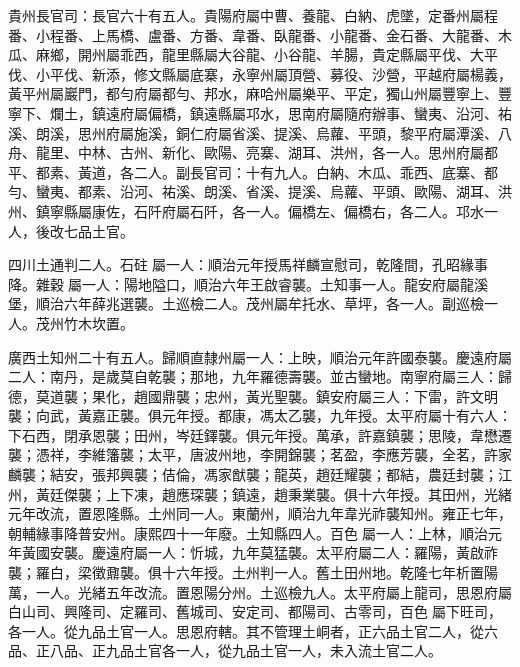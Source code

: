\begin{pinyinscope}
貴州長官司：長官六十有五人。貴陽府屬中曹、養龍、白納、虎墜，定番州屬程番、小程番、上馬橋、盧番、方番、韋番、臥龍番、小龍番、金石番、大龍番、木瓜、麻鄉，開州屬乖西，龍里縣屬大谷龍、小谷龍、羊腸，貴定縣屬平伐、大平伐、小平伐、新添，修文縣屬底寨，永寧州屬頂營、募役、沙營，平越府屬楊義，黃平州屬巖門，都勻府屬都勻、邦水，麻哈州屬樂平、平定，獨山州屬豐寧上、豐寧下、爛土，鎮遠府屬偏橋，鎮遠縣屬邛水，思南府屬隨府辦事、蠻夷、沿河、祐溪、朗溪，思州府屬施溪，銅仁府屬省溪、提溪、烏蘿、平頭，黎平府屬潭溪、八舟、龍里、中林、古州、新化、歐陽、亮寨、湖耳、洪州，各一人。思州府屬都平、都素、黃道，各二人。副長官司：十有九人。白納、木瓜、乖西、底寨、都勻、蠻夷、都素、沿河、祐溪、朗溪、省溪、提溪、烏蘿、平頭、歐陽、湖耳、洪州、鎮寧縣屬康佐，石阡府屬石阡，各一人。偏橋左、偏橋右，各二人。邛水一人，後改七品土官。

四川土通判二人。石砫屬一人：順治元年授馬祥麟宣慰司，乾隆間，孔昭緣事降。雜穀屬一人：陽地隘口，順治六年王啟睿襲。土知事一人。龍安府屬龍溪堡，順治六年薛兆選襲。土巡檢二人。茂州屬牟托水、草坪，各一人。副巡檢一人。茂州竹木坎置。

廣西土知州二十有五人。歸順直隸州屬一人：上映，順治元年許國泰襲。慶遠府屬二人：南丹，是歲莫自乾襲；那地，九年羅德壽襲。並古蠻地。南寧府屬三人：歸德，莫道襲；果化，趙國鼎襲；忠州，黃光聖襲。鎮安府屬三人：下雷，許文明襲；向武，黃嘉正襲。俱元年授。都康，馮太乙襲，九年授。太平府屬十有六人：下石西，閉承恩襲；田州，岑廷鐸襲。俱元年授。萬承，許嘉鎮襲；思陵，韋懋遷襲；憑祥，李維籓襲；太平，唐波州地，李開錦襲；茗盈，李應芳襲，全茗，許家麟襲；結安，張邦興襲；佶倫，馮家猷襲；龍英，趙廷耀襲；都結，農廷封襲；江州，黃廷傑襲；上下凍，趙應琛襲；鎮遠，趙秉業襲。俱十六年授。其田州，光緒元年改流，置恩隆縣。土州同一人。東蘭州，順治九年韋光祚襲知州。雍正七年，朝輔緣事降普安州。康熙四十一年廢。土知縣四人。百色屬一人：上林，順治元年黃國安襲。慶遠府屬一人：忻城，九年莫猛襲。太平府屬二人：羅陽，黃啟祚襲；羅白，梁徵鼐襲。俱十六年授。土州判一人。舊土田州地。乾隆七年析置陽萬，一人。光緒五年改流。置恩陽分州。土巡檢九人。太平府屬上龍司，思恩府屬白山司、興隆司、定羅司、舊城司、安定司、都陽司、古零司，百色屬下旺司，各一人。從九品土官一人。思恩府轄。其不管理土峒者，正六品土官二人，從六品、正八品、正九品土官各一人，從九品土官一人，未入流土官二人。


\end{pinyinscope}
